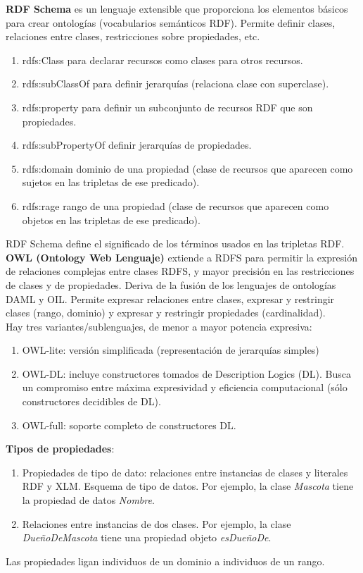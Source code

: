 \documentclass[12pt]{article}
\begin{document}
\textbf{RDF Schema} es un lenguaje extensible que proporciona los elementos básicos para crear ontologías (vocabularios semánticos RDF). Permite definir clases, relaciones entre clases, restricciones sobre propiedades, etc.
\begin{enumerate}
\item rdfs:Class para declarar recursos como clases para otros recursos.
\item rdfs:subClassOf para definir jerarquías (relaciona clase con superclase).
\item rdfs:property para definir un subconjunto de recursos RDF que son propiedades.
\item rdfs:subPropertyOf definir jerarquías de propiedades.
\item rdfs:domain dominio de una propiedad (clase de recursos que aparecen como sujetos en las tripletas de ese predicado).
\item rdfs:rage rango de una propiedad (clase de recursos que aparecen como objetos en las tripletas de ese predicado).
\end{enumerate}
RDF Schema define el significado de los términos usados en las tripletas RDF.\\

\textbf{OWL (Ontology Web Lenguaje)} extiende a RDFS para permitir la expresión de relaciones complejas entre clases RDFS, y mayor precisión en las restricciones de clases y de propiedades. Deriva de la fusión de los lenguajes de ontologías DAML y OIL. Permite expresar relaciones entre clases, expresar y restringir clases (rango, dominio) y expresar y restringir propiedades (cardinalidad).\\
Hay tres variantes/sublenguajes, de menor a mayor potencia expresiva:
\begin{enumerate}
\item OWL-lite: versión simplificada (representación de jerarquías simples)
\item OWL-DL: incluye constructores tomados de Description Logics (DL). Busca un compromiso entre máxima expresividad y eficiencia computacional (sólo constructores decidibles de DL).
\item OWL-full: soporte completo de constructores DL.
\end{enumerate}

\textbf{Tipos de propiedades}:
\begin{enumerate}
\item Propiedades de tipo de dato: relaciones entre instancias de clases y literales RDF y XLM. Esquema de tipo de datos. Por ejemplo, la clase \textit{Mascota} tiene la propiedad de datos \textit{Nombre}.
\item Relaciones entre instancias de dos clases. Por ejemplo, la clase \textit{DueñoDeMascota} tiene una propiedad objeto \textit{esDueñoDe}.
\end{enumerate}
Las propiedades ligan individuos de un dominio a individuos de un rango.\\
\end{document}
